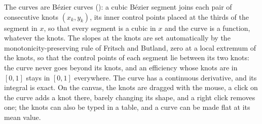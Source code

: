 The curves are B\'ezier curves (): a cubic B\'ezier segment joins each pair of consecutive knots
$(x_k,y_k)$, its inner control points placed at the thirds of the segment in $x$, so that every segment is a cubic in
$x$ and the curve is a function, whatever the knots. The slopes at the knots are set automatically by the
monotonicity-preserving rule of Fritsch and Butland, zero at a local extremum of the knots, so that the control
points of each segment lie between its two knots: the curve never goes beyond its knots, and an efficiency whose
knots are in $[0,1]$ stays in $[0,1]$ everywhere. The curve has a continuous derivative, and its integral is exact.
On the canvas, the knots are dragged with the mouse, a click on the curve adds a knot there, barely changing its
shape, and a right click removes one; the knots can also be typed in a table, and a curve can be made flat at its
mean value.
